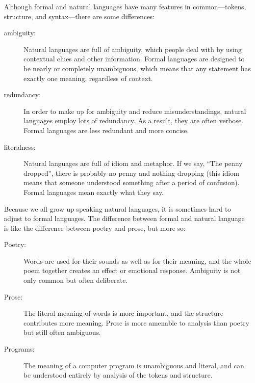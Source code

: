 Although formal and natural languages have many features in common---tokens,
structure, and syntax---there are some differences:

\begin{description}

\item[ambiguity:] Natural languages are full of ambiguity, which
people deal with by using contextual clues and other information.
Formal languages are designed to be nearly or completely unambiguous,
which means that any statement has exactly one meaning,
regardless of context.

\item[redundancy:] In order to make up for ambiguity and reduce
misunderstandings, natural languages employ lots of redundancy. As a result,
they are often verbose. Formal languages are less redundant and more concise.

\item[literalness:] Natural languages are full of idiom and metaphor. If we
say, ``The penny dropped'', there is probably no penny and nothing dropping
(this idiom means that someone understood something after a period of
confusion). Formal languages mean exactly what they say.

\end{description}

Because we all grow up speaking natural languages, it is sometimes hard to
adjust to formal languages. The difference between formal and natural language
is like the difference between poetry and prose, but more so: 

\begin{description}

\item[Poetry:] Words are used for their sounds as well as for their meaning,
and the whole poem together creates an effect or emotional response. Ambiguity
is not only common but often deliberate.

\item[Prose:] The literal meaning of words is more important, and the
structure contributes more meaning. Prose is more amenable to analysis than
poetry but still often ambiguous.

\item[Programs:] The meaning of a computer program is unambiguous and literal,
and can be understood entirely by analysis of the tokens and structure.

\end{description}

